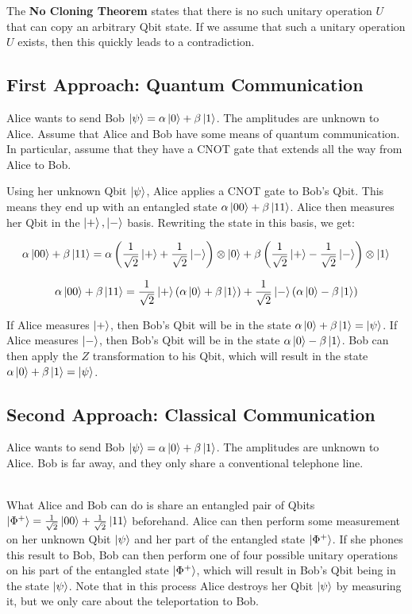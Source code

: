 \documentclass[12pt]{article}
\begin{document}
\noindent
The \textbf{No Cloning Theorem} states that there is no such unitary operation $U$ that can copy an arbitrary Qbit state.
If we assume that such a unitary operation $U$ exists, then this quickly leads to a contradiction.

\subsection*{First Approach: Quantum Communication}
Alice wants to send Bob $\ket{\psi} = \alpha \ket{0} + \beta \ket{1}$.
The amplitudes are unknown to Alice.
Assume that Alice and Bob have some means of quantum communication.
In particular, assume that they have a CNOT gate that extends all the way from Alice to Bob.

\newpage
\noindent
Using her unknown Qbit $\ket{\psi}$, Alice applies a CNOT gate to Bob's Qbit.
This means they end up with an entangled state $\alpha \ket{00} + \beta \ket{11}$.
Alice then measures her Qbit in the $\ket{+}, \ket{-}$ basis.
Rewriting the state in this basis, we get:

\[ \alpha \ket{00} + \beta \ket{11} = \alpha \left( \frac{1}{\sqrt{2}}\ket{+} + \frac{1}{\sqrt{2}}\ket{-} \right) \otimes \ket{0} + \beta \left( \frac{1}{\sqrt{2}}\ket{+} - \frac{1}{\sqrt{2}}\ket{-} \right) \otimes \ket{1} \]

\[ \alpha \ket{00} + \beta \ket{11} = \frac{1}{\sqrt{2}}\ket{+}\left( \alpha \ket{0} + \beta \ket{1} \right) + \frac{1}{\sqrt{2}}\ket{-}\left( \alpha \ket{0} - \beta \ket{1} \right) \]

\noindent
If Alice measures $\ket{+}$, then Bob's Qbit will be in the state $\alpha \ket{0} + \beta \ket{1} = \ket{\psi}$.
If Alice measures $\ket{-}$, then Bob's Qbit will be in the state $\alpha \ket{0} - \beta \ket{1}$.
Bob can then apply the $Z$ transformation to his Qbit, which will result in the state $\alpha \ket{0} + \beta \ket{1} = \ket{\psi}$.

\subsection*{Second Approach: Classical Communication}
Alice wants to send Bob $\ket{\psi} = \alpha \ket{0} + \beta \ket{1}$.
The amplitudes are unknown to Alice.
Bob is far away, and they only share a conventional telephone line.

\noindent
\\
What Alice and Bob can do is share an entangled pair of Qbits $\ket{\Phi^+} = \frac{1}{\sqrt{2}}\ket{00} + \frac{1}{\sqrt{2}}\ket{11}$ beforehand.
Alice can then perform some measurement on her unknown Qbit $\ket{\psi}$ and her part of the entangled state $\ket{\Phi^+}$.
If she phones this result to Bob, Bob can then perform one of four possible unitary operations on his part of the entangled state $\ket{\Phi^+}$, which will result in Bob's Qbit being in the state $\ket{\psi}$.
Note that in this process Alice destroys her Qbit $\ket{\psi}$ by measuring it, but we only care about the teleportation to Bob.
\end{document}
